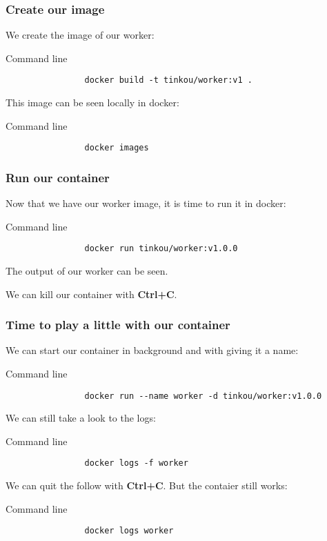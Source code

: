 	\begin{frame}[fragile]
		\frametitle{Create our image}
		
		We create the image of our worker:
		
		\begin{block}{Command line}
			\begin{verbatim}
				docker build -t tinkou/worker:v1 .
			\end{verbatim}
		\end{block}
		
		This image can be seen locally in docker:

		\begin{block}{Command line}
			\begin{verbatim}
				docker images
			\end{verbatim}
		\end{block}
		
	\end{frame}
	
	\begin{frame}[fragile]
		\frametitle{Run our container}
		
		Now that we have our worker image, it is time to run it in docker:
		
		\begin{block}{Command line}
			\begin{verbatim}
				docker run tinkou/worker:v1.0.0
			\end{verbatim}
		\end{block}
		The output of our worker can be seen.
		
		We can kill our container with \textbf{Ctrl+C}.
		
	\end{frame}
	
	\begin{frame}[fragile]
		\frametitle{Time to play a little with our container}
		
		We can start our container in background and with giving it a name:
		\begin{block}{Command line}
			\begin{verbatim}
				docker run --name worker -d tinkou/worker:v1.0.0
			\end{verbatim}
		\end{block}
		
		\bigskip
		We can still take a look to the logs:
		\begin{block}{Command line}
			\begin{verbatim}
				docker logs -f worker
			\end{verbatim}
		\end{block}
		We can quit the follow with \textbf{Ctrl+C}. But the contaier still works:
		\begin{block}{Command line}
			\begin{verbatim}
				docker logs worker
			\end{verbatim}
		\end{block}

	\end{frame}
	

